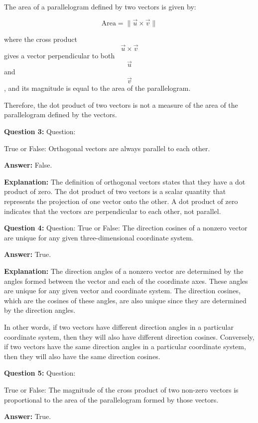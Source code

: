 \documentclass{article}
\begin{document}
The area of a parallelogram defined by two vectors is given by:

$$ \text{Area} = \|\vec{u} \times \vec{v}\| $$

where the cross product $$\vec{u}\times\vec{v}$$ gives a vector perpendicular to both $$\vec{u}$$ and $$\vec{v}$$, and its magnitude is equal to the area of the parallelogram.

Therefore, the dot product of two vectors is not a measure of the area of the parallelogram defined by the vectors.

\pagebreak 

    
\textbf {Question 3:} Question:

True or False: Orthogonal vectors are always parallel to each other.

\textbf{Answer:} False.

\textbf{Explanation:} The definition of orthogonal vectors states that they have a dot product of zero. The dot product of two vectors is a scalar quantity that represents the projection of one vector onto the other. A dot product of zero indicates that the vectors are perpendicular to each other, not parallel.

\pagebreak 

    
\textbf {Question 4:} Question:
True or False: The direction cosines of a nonzero vector are unique for any given three-dimensional coordinate system.

\textbf{Answer:} True.

\textbf{Explanation:} The direction angles of a nonzero vector are determined by the angles formed between the vector and each of the coordinate axes. These angles are unique for any given vector and coordinate system. The direction cosines, which are the cosines of these angles, are also unique since they are determined by the direction angles.

In other words, if two vectors have different direction angles in a particular coordinate system, then they will also have different direction cosines. Conversely, if two vectors have the same direction angles in a particular coordinate system, then they will also have the same direction cosines.

\pagebreak 

    
\textbf {Question 5:} Question:

True or False: The magnitude of the cross product of two non-zero vectors is proportional to the area of the parallelogram formed by those vectors.

\textbf{Answer:} True.
\end{document}
